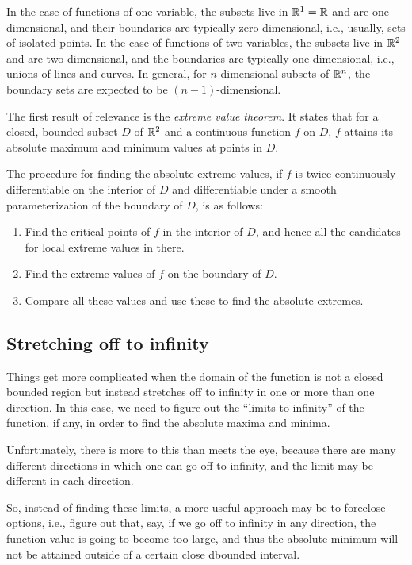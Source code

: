 \documentclass[10pt]{amsart}
\begin{document}
In the case of functions of one variable, the subsets live in $\mathbb{R}^1 =
\mathbb{R}$ and are one-dimensional, and their boundaries are typically
zero-dimensional, i.e., usually, sets of isolated points. In the case
of functions of two variables, the subsets live in $\mathbb{R}^2$ and are
two-dimensional, and the boundaries are typically one-dimensional,
i.e., unions of lines and curves. In general, for $n$-dimensional
subsets of $\mathbb{R}^n$, the boundary sets are expected to be $(n -
1)$-dimensional.

The first result of relevance is the {\em extreme value
theorem}. It states that for a closed, bounded subset $D$ of $\mathbb{R}^2$
and a continuous function $f$ on $D$, $f$ attains its absolute maximum
and minimum values at points in $D$.

The procedure for finding the absolute extreme values, if $f$ is twice
continuously differentiable on the interior of $D$ and differentiable
under a smooth parameterization of the boundary of $D$, is as follows:

\begin{enumerate}
\item Find the critical points of $f$ in the interior of $D$, and
  hence all the candidates for local extreme values in there.
\item Find the extreme values of $f$ on the boundary of $D$.
\item Compare all these values and use these to find the absolute
  extremes.
\end{enumerate}

\subsection{Stretching off to infinity}

Things get more complicated when the domain of the function is not a
closed bounded region but instead stretches off to infinity in one or
more than one direction. In this case, we need to figure out the
``limits to infinity'' of the function, if any, in order to find the
absolute maxima and minima.

Unfortunately, there is more to this than meets the eye, because there
are many different directions in which one can go off to infinity, and
the limit may be different in each direction.

So, instead of finding these limits, a more useful approach may be to
foreclose options, i.e., figure out that, say, if we go off to
infinity in any direction, the function value is going to become too
large, and thus the absolute minimum will not be attained outside of a
certain close dbounded interval.
\end{document}
